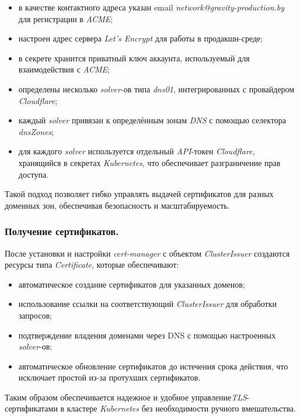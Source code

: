 \begin{itemize}
    \item в качестве контактного адреса указан email \textit{network@gravity-production.by} для регистрации в \textit{ACME};
    \item настроен адрес сервера \textit{Let's Encrypt} для работы в продакшн-среде;
    \item в секрете хранится приватный ключ аккаунта, используемый для взаимодействия с \textit{ACME};
    \item определены несколько \textit{solver}-ов типа \textit{dns01}, интегрированных с провайдером \textit{Cloudflare};
    \item каждый \textit{solver} привязан к определённым зонам \textit{DNS} с помощью селектора \textit{dnsZones};
    \item для каждого \textit{solver} используется отдельный \textit{API}-токен \textit{Cloudflare}, хранящийся в секретах \textit{Kubernetes}, что обеспечивает разграничение прав доступа.
\end{itemize}

Такой подход позволяет гибко управлять выдачей сертификатов для разных доменных зон, обеспечивая безопасность и масштабируемость.

\subsubsection{Получение сертификатов.} После установки и настройки \textit{cert-manager} с объектом \textit{ClusterIssuer} создаются ресурсы типа \textit{Certificate}, которые обеспечивают:

\begin{itemize}
    \item автоматическое создание сертификатов для указанных доменов;
    \item использование ссылки на соответствующий \textit{ClusterIssuer} для обработки запросов;
    \item подтверждение владения доменами через DNS с помощью настроенных \textit{solver}-ов;
    \item автоматическое обновление сертификатов до истечения срока действия, что исключает простой из-за протухших сертификатов.
\end{itemize}

Таким образом обеспечивается надежное и удобное управление\textit{TLS}-сертификатами в кластере \textit{Kubernetes} без необходимости ручного вмешательства.



